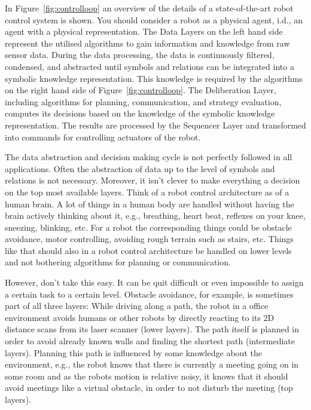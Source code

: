 In Figure~\ref{fig:controlloop} an overview of the details of a state-of-the-art robot control system is shown. You should consider a robot as a physical agent, i.d., an agent with a physical representation. The Data Layers on the left hand side represent the utilised algorithms to gain information and knowledge from raw sensor data. During the data processing, the data is continuously filtered, condensed, and abstracted until symbols and relations can be integrated into a symbolic knowledge representation. This knowledge is required by the algorithms on the right hand side of Figure~\ref{fig:controlloop}. The Deliberation Layer, including algorithms for planning, communication, and strategy evaluation, computes its decisions based on the knowledge of the symbolic knowledge representation. The results are processed by the Sequencer Layer and transformed into commands for controlling actuators of the robot. 
 
The data abstraction and decision making cycle is not perfectly followed in all applications. Often the abstraction of data up to the level of symbols and relations is not necessary. Moreover, it isn't clever to make everything a decision on the top most available layers. Think of a robot control architecture as of a human brain. A lot of things in a human body are handled without having the brain actively thinking about it, e.g., breathing, heart beat, reflexes on your knee, sneezing, blinking, etc. For a robot the corresponding things could be obstacle avoidance, motor controlling, avoiding rough terrain such as stairs, etc. Things like that should also in a robot control architecture be handled on lower levels and not bothering algorithms for planning or communication. 
 
However, don't take this easy. It can be quit difficult or even impossible to assign a certain task to a certain level. Obstacle avoidance, for example, is sometimes part of all three layers: While driving along a path, the robot in a office environment avoids humans or other robots by directly reacting to its 2D distance scans from its laser scanner (lower layers). The path itself is planned in order to avoid already known walls and finding the shortest path (intermediate layers). Planning this path is influenced by some knowledge about the environment, e.g., the robot knows that there is currently a meeting going on in some room and as the robots motion is relative noisy, it knows that it should avoid meetings like a virtual obstacle, in order to not disturb the meeting (top layers).

